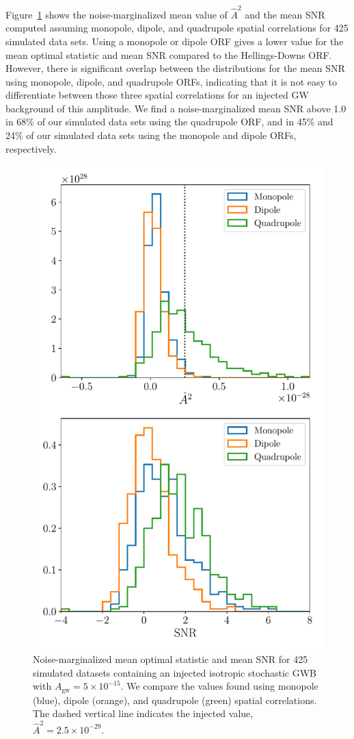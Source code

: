 \documentclass[twocolumn,aps,prd,superscriptaddress]{revtex4-1}
\newcommand{\Agw}{\ensuremath{A_\mathrm{gw}}}
\begin{document}
Figure~\ref{fig:os_ORF} shows the noise-marginalized mean value of $\hat{A}^2$ and the mean SNR 
computed assuming monopole, dipole, and quadrupole spatial correlations 
for 425 simulated data sets. Using a monopole or dipole ORF 
gives a lower value for the mean optimal statistic and mean SNR compared to the 
Hellings-Downs ORF. 
However, there is significant overlap between the distributions for the mean SNR using 
monopole, dipole, and quadrupole ORFs, indicating that it is not easy to differentiate 
between those three spatial correlations for an injected GW background of this amplitude. 
We find a noise-marginalized mean SNR above 1.0 in 68\% of our simulated data sets 
using the quadrupole ORF, and in 45\% and 24\% of our simulated data sets 
using the monopole and dipole ORFs, respectively.
\begin{figure}[htb]
	\includegraphics[width=0.9\columnwidth]{plots/os_datasetstats_5e-15_ORF.pdf}
	\caption{Noise-marginalized mean optimal statistic and mean SNR for 425 simulated datasets 
			containing an injected isotropic stochastic GWB with $\Agw = 5\times10^{-15}$. 
			We compare the values found using monopole (blue), dipole (orange), 
			and quadrupole (green) spatial correlations. 
			The dashed vertical line indicates the injected value, $\hat{A}^2 = 2.5 \times 10^{-29}$.}
	\label{fig:os_ORF}
\end{figure}
\end{document}
